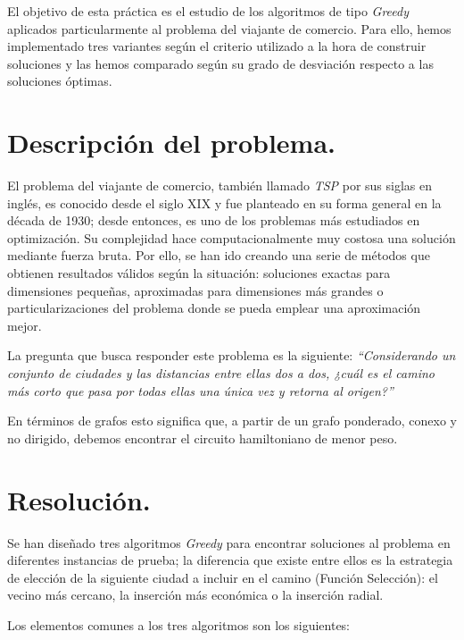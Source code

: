\documentclass[11pt,a4paper]{article}
\begin{document}
		\par
		El objetivo de esta práctica es el estudio de los algoritmos de tipo \textit{Greedy} aplicados particularmente al problema del viajante de comercio. Para ello, hemos implementado tres variantes según el criterio utilizado a la hora de construir soluciones y las hemos comparado según su grado de desviación respecto a las soluciones óptimas.

	\section{Descripción del problema.}

		\par
		El problema del viajante de comercio, también llamado \textit{TSP} por sus siglas en inglés, es conocido desde el siglo XIX y fue planteado en su forma general en la década de 1930; desde entonces, es uno de los problemas más estudiados en optimización. Su complejidad hace computacionalmente muy costosa una solución mediante fuerza bruta. Por ello, se han ido creando una serie de métodos que obtienen resultados válidos según la situación: soluciones exactas para dimensiones pequeñas, aproximadas para dimensiones más grandes o particularizaciones del problema donde se pueda emplear una aproximación mejor.

		\par
		La pregunta que busca responder este problema es la siguiente: \textit{``Considerando un conjunto de ciudades y las distancias entre ellas dos a dos, ¿cuál es el camino más corto que pasa por todas ellas una única vez y retorna al origen?''}

		\par
		En términos de grafos esto significa que, a partir de un grafo ponderado, conexo y no dirigido, debemos encontrar el circuito hamiltoniano de menor peso.

	\section{Resolución.}

		\par
		Se han diseñado tres algoritmos \textit{Greedy} para encontrar soluciones al problema en diferentes instancias de prueba; la diferencia que existe entre ellos es la estrategia de elección de la siguiente ciudad a incluir en el camino (Función Selección): el vecino más cercano, la inserción más económica o la inserción radial.

		\par
		Los elementos comunes a los tres algoritmos son los siguientes:
\end{document}

